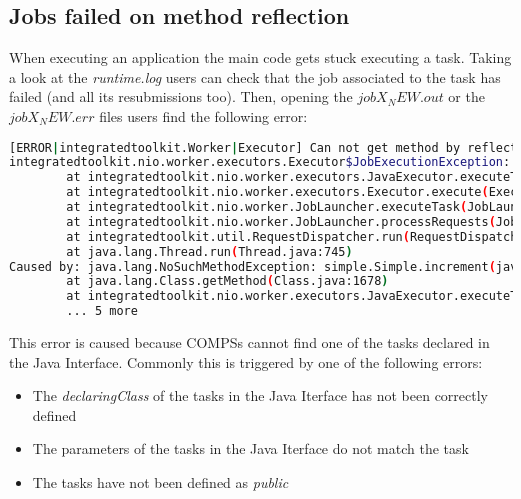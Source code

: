 
\subsection{Jobs failed on method reflection}
When executing an application the main code gets stuck executing a task. Taking a look at the \textit{runtime.log} users can check
that the job associated to the task has failed (and all its resubmissions too). Then, opening the \textit{$jobX_NEW.out$} or the
\textit{$jobX_NEW.err$} files users find the following error:

\begin{lstlisting}[language=bash]
[ERROR|integratedtoolkit.Worker|Executor] Can not get method by reflection
integratedtoolkit.nio.worker.executors.Executor$JobExecutionException: Can not get method by reflection
        at integratedtoolkit.nio.worker.executors.JavaExecutor.executeTask(JavaExecutor.java:142)
        at integratedtoolkit.nio.worker.executors.Executor.execute(Executor.java:42)
        at integratedtoolkit.nio.worker.JobLauncher.executeTask(JobLauncher.java:46)
        at integratedtoolkit.nio.worker.JobLauncher.processRequests(JobLauncher.java:34)
        at integratedtoolkit.util.RequestDispatcher.run(RequestDispatcher.java:46)
        at java.lang.Thread.run(Thread.java:745)
Caused by: java.lang.NoSuchMethodException: simple.Simple.increment(java.lang.String)
        at java.lang.Class.getMethod(Class.java:1678)
        at integratedtoolkit.nio.worker.executors.JavaExecutor.executeTask(JavaExecutor.java:140)
        ... 5 more
\end{lstlisting}

This error is caused because COMPSs cannot find one of the tasks declared in the Java Interface. Commonly this is triggered by
one of the following errors:

\begin{itemize}
 \item The \textit{declaringClass} of the tasks in the Java Iterface has not been correctly defined
 \item The parameters of the tasks in the Java Iterface do not match the task
 \item The tasks have not been defined as \textit{public}
\end{itemize}

